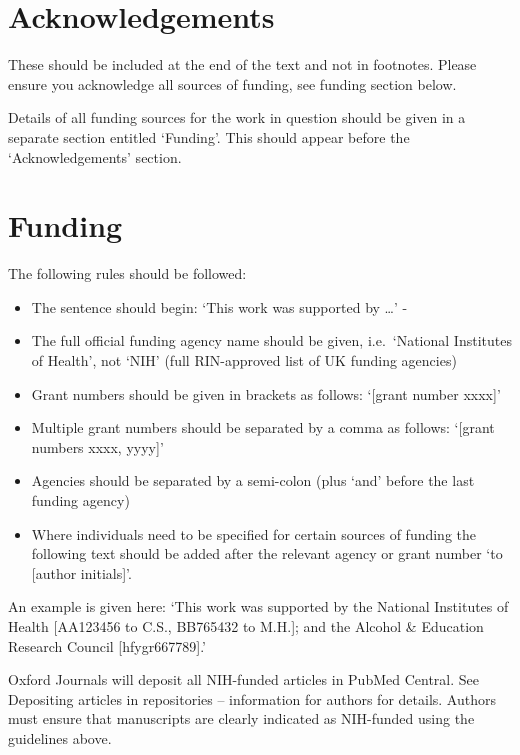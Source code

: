 \documentclass{bioinfo}
\providecommand{\tightlist}{%
  \setlength{\itemsep}{0pt}\setlength{\parskip}{0pt}}
\begin{document}
\section*{Acknowledgements}

These should be included at the end of the text and not in footnotes.
Please ensure you acknowledge all sources of funding, see funding
section below.

Details of all funding sources for the work in question should be given
in a separate section entitled `Funding'. This should appear before the
`Acknowledgements' section.

\section*{Funding}

The following rules should be followed:

\begin{itemize}
\tightlist
\item
  The sentence should begin: `This work was supported by \ldots{}' -
\item
  The full official funding agency name should be given, i.e.~`National
  Institutes of Health', not `NIH' (full RIN-approved list of UK funding
  agencies)
\item
  Grant numbers should be given in brackets as follows: `{[}grant number
  xxxx{]}'
\item
  Multiple grant numbers should be separated by a comma as follows:
  `{[}grant numbers xxxx, yyyy{]}'
\item
  Agencies should be separated by a semi-colon (plus `and' before the
  last funding agency)
\item
  Where individuals need to be specified for certain sources of funding
  the following text should be added after the relevant agency or grant
  number `to {[}author initials{]}'.
\end{itemize}

An example is given here: `This work was supported by the National
Institutes of Health {[}AA123456 to C.S., BB765432 to M.H.{]}; and the
Alcohol \& Education Research Council {[}hfygr667789{]}.'

Oxford Journals will deposit all NIH-funded articles in PubMed Central.
See Depositing articles in repositories -- information for authors for
details. Authors must ensure that manuscripts are clearly indicated as
NIH-funded using the guidelines above.




\end{document}
